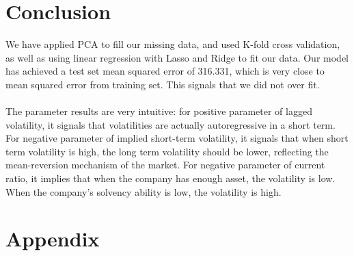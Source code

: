 \documentclass[b4paper]{article}
\begin{document}
\section{Conclusion}
We have applied PCA to fill our missing data, and used K-fold cross validation, as well as using linear regression with Lasso and Ridge to fit our data. Our model has achieved a test set mean squared error of 316.331, which is very close to mean squared error from training set. This signals that we did not over fit.
\\\\The parameter results are very intuitive: for positive parameter of lagged volatility, it signals that volatilities are actually autoregressive in a short term. For negative parameter of implied short-term volatility, it signals that when short term volatility is high, the long term volatility should be lower, reflecting the mean-reversion mechanism of the market. For negative parameter of current ratio, it implies that when the company has enough asset, the volatility is low. When the company's solvency ability is low, the volatility is high.


\section{Appendix}
\end{document}
